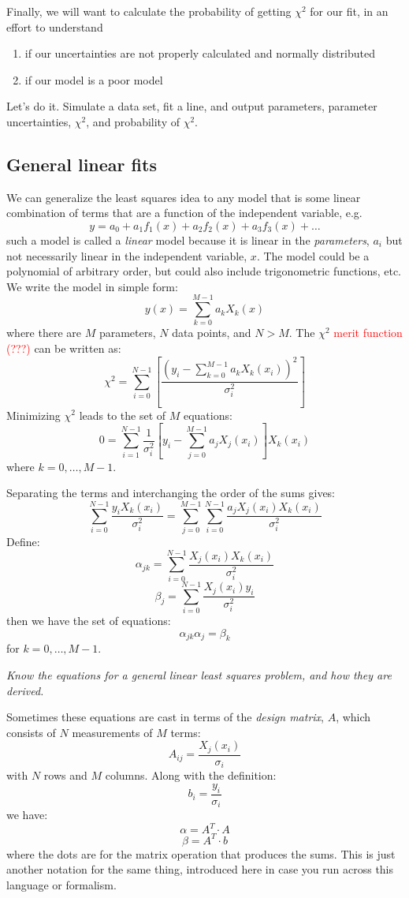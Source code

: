 \documentclass{article}
\newcommand{\test}[1]{%
    \begin{center}
        \colorbox{hl}{\parbox{0.9\textwidth}{\emph{#1}}}
    \end{center}}
\begin{document}
Finally, we will want to calculate the probability of getting
$ \chi^{2}$ for our fit,
in an effort to understand
\begin{enumerate}
    \item if our uncertainties are not properly calculated and
        normally distributed
    \item if our model is a poor model
\end{enumerate}

Let's do it. Simulate a data set, fit a line, and output parameters, parameter
uncertainties, $\chi^2$, and probability of $\chi^2$.

\subsection{General linear fits}
We can generalize the least squares idea to any model that is some linear
combination of terms that are a function of the independent variable,
e.g.
$$ y = a_0 + a_1f_1(x) + a_2f_2(x) + a_3f_3(x) + \ldots
$$
such a model is called a \emph{linear} model because it is linear
in the \emph{parameters}, $a_{i}$ but not necessarily linear in the independent
variable, $x$. The model could be a polynomial of arbitrary order, but
could also include trigonometric functions, etc. We write the model
in simple form:
$$  y(x) = \sum_{k=0}^{M-1}a_kX_k(x)
$$
where there are $M$ parameters, $N$ data points, and $N>M$.
The $\chi^2$ \textcolor{red}{merit function (???)} can be written as:
$$ \chi^2 = \sum_{i=0}^{N-1} \left[
    \frac{(y_i - \sum_{k=0}^{M-1} a_{k}X_{k}(x_{i}))^{2}}
    {\sigma_{i}^{2}} \right]
$$
Minimizing $\chi^2$ leads to the set of $M$ equations:
$$ 0 = \sum_{i=1}^{N-1}\frac{1}{\sigma_i^2}
    \left[y_{i} - \sum_{j=0}^{M-1}a_{j}X_{j}(x_{i})\right]X_{k}(x_{i})
$$
where $k=0,\ldots,M-1$.

Separating the terms and interchanging the order of the sums gives:
$$  \sum_{i=0}^{N-1}\frac{y_{i}X_{k}(x_{i})}{\sigma_{i}^{2}} =
    \sum_{j=0}^{M-1}\sum_{i=0}^{N-1}\frac{a_{j}X_{j}(x_{i})X_{k}(x_{i})}{\sigma_{i}^{2}}
$$
Define:
$$ \alpha_{jk} = \sum_{i=0}^{N-1}\frac{X_{j}(x_{i})X_{k}(x_{i})}{\sigma_{i}^{2}}
$$
$$ \beta_{j} = \sum_{i=0}^{N-1}\frac{X_{j}(x_{i})y_{i}}{\sigma_{i}^{2}}
$$
then we have the set of equations:
$$ \alpha_{jk}\alpha_{j} = \beta_{k} $$
for $k=0,\ldots,M-1$.

\test{Know the equations for a general linear least squares
problem, and how they are derived.}

Sometimes these equations are cast in terms of the \emph{design matrix},
$A$, which consists of $N$ measurements of $M$ terms:
$$ A_{ij} = \frac{X_j(x_i)}{\sigma_i}
$$
with $N$ rows and $M$ columns. Along with the definition:
$$ b_i = \frac{y_i}{\sigma_i} $$
we have:
$$ \alpha = A^{T} \cdot A $$
$$ \beta = A^{T} \cdot b $$
where the dots are for the matrix operation that produces the sums.
This is just another notation for the same thing, introduced here in
case you run across this language or formalism.
\end{document}
